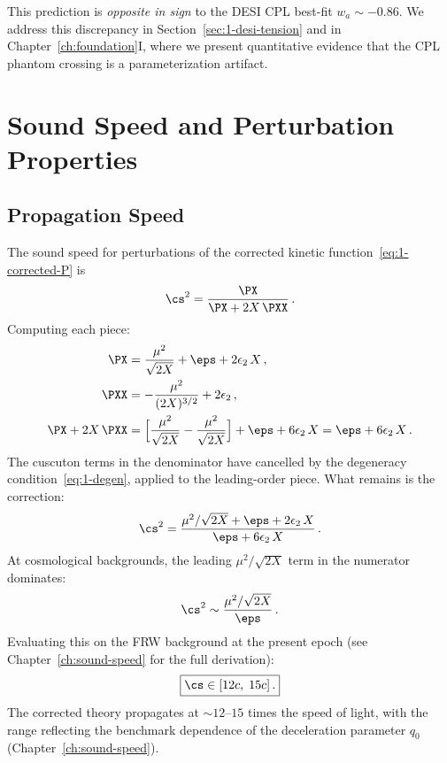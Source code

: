 This prediction is \emph{opposite in sign} to the DESI CPL best-fit $w_a \sim -0.86$. We address this discrepancy in Section~\ref{sec:1-desi-tension} and in Chapter~\ref{ch:foundation}I, where we present quantitative evidence that the CPL phantom crossing is a parameterization artifact.


\section{Sound Speed and Perturbation Properties}
\label{sec:1-sound}

\subsection{Propagation Speed}
\label{sec:1-propagation}

The sound speed for perturbations of the corrected kinetic function~\eqref{eq:1-corrected-P} is
\begin{equation}
\label{eq:1-cs-def}
\cs^2 = \frac{\PX}{\PX + 2X\,\PXX}\,.
\end{equation}
Computing each piece:
\begin{align}
\PX &= \frac{\mu^2}{\sqrt{2X}} + \eps + 2\epsilon_2\, X\,, \label{eq:1-PX-corrected}\\
\PXX &= -\frac{\mu^2}{(2X)^{3/2}} + 2\epsilon_2\,, \label{eq:1-PXX-corrected}\\
\PX + 2X\,\PXX &= \Bigl[\frac{\mu^2}{\sqrt{2X}} - \frac{\mu^2}{\sqrt{2X}}\Bigr] + \eps + 6\epsilon_2\, X = \eps + 6\epsilon_2\, X\,. \label{eq:1-denominator}
\end{align}
The cuscuton terms in the denominator have cancelled by the degeneracy condition~\eqref{eq:1-degen}, applied to the leading-order piece. What remains is the correction:
\begin{equation}
\label{eq:1-cs-full}
\cs^2 = \frac{\mu^2/\sqrt{2X} + \eps + 2\epsilon_2\, X}{\eps + 6\epsilon_2\, X}\,.
\end{equation}
At cosmological backgrounds, the leading $\mu^2/\sqrt{2X}$ term in the numerator dominates:
\begin{equation}
\label{eq:1-cs-approx}
\cs^2 \sim \frac{\mu^2/\sqrt{2X}}{\eps}\,.
\end{equation}
Evaluating this on the FRW background at the present epoch (see Chapter~\ref{ch:sound-speed} for the full derivation):
\begin{equation}
\label{eq:1-cs-value}
\boxed{\cs \in [12c,\; 15c]\,.}
\end{equation}
The corrected theory propagates at ${\sim}12$--$15$ times the speed of light, with the range reflecting the benchmark dependence of the deceleration parameter $q_0$ (Chapter~\ref{ch:sound-speed}).


